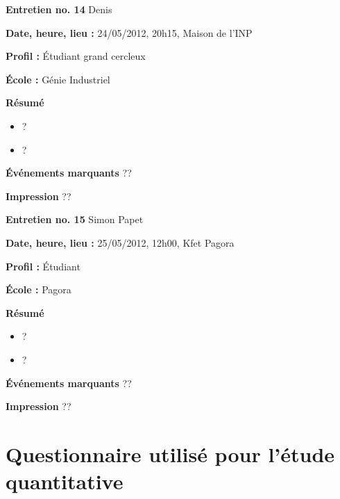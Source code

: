 \documentclass[a4paper, 11px]{article}
\begin{document}
\vspace{.3cm}

 \textbf {\large Entretien no. 14}
Denis

\textbf{Date, heure, lieu : }
24/05/2012, 20h15, Maison de l'INP

\textbf{Profil : }
Étudiant grand cercleux

\textbf{École : }
Génie Industriel

\textbf{Résumé}
	\begin{itemize}
		\item ?
		\item ?
	\end{itemize}

\textbf{Événements marquants}
??

\textbf{Impression}
??



\vspace{.3cm}

 \textbf {\large Entretien no. 15}
Simon Papet

\textbf{Date, heure, lieu : }
25/05/2012, 12h00, Kfet Pagora

\textbf{Profil : }
Étudiant 

\textbf{École : }
Pagora

\textbf{Résumé}
	\begin{itemize}
		\item ?
		\item ?
	\end{itemize}

\textbf{Événements marquants}
??

\textbf{Impression}
??
\newpage

\section{Questionnaire utilisé pour l'étude quantitative}
\end{document}

